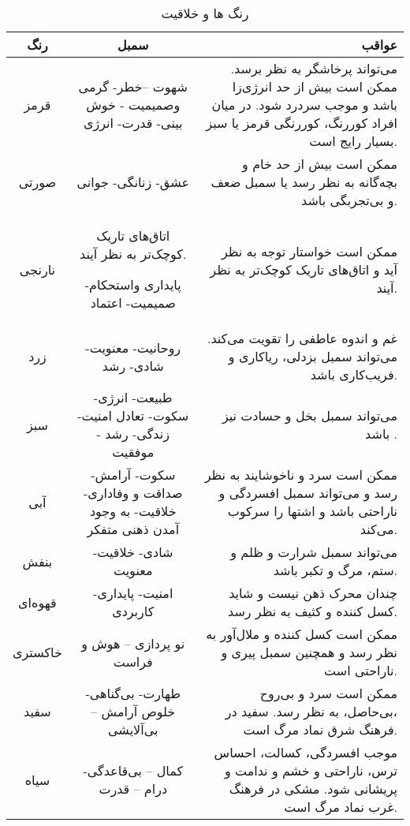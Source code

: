 \documentclass[12pt]{report}
\begin{document}
\begin{table}
\begin{center}
	\fontsize{10}{11}\selectfont
	\begin{tabulary}{1.0\textwidth}{CCR}
\hline
 رنگ & سمبل & عواقب \\ 
\hline 
\hline 
 قرمز & شهوت –خطر- گرمی وصمیمیت - خوش بینی- قدرت- انرژی & می‌تواند پرخاشگر به نظر برسد. ممکن است بیش از حد انرژی‌زا باشد و موجب سردرد شود. 
در میان افراد کوررنگ، کوررنگی قرمز یا سبز بسیار رایج است. \\ 
\hline
 صورتی & عشق- زنانگی- جوانی & ممکن است بیش از حد خام و بچه‌گانه به نظر رسد یا سمبل ضعف و بی‌تجربگی باشد. \\ 
\hline
 نارنجی & اتاق‌های تاریک کوچک‌تر به نظر آیند.

پایداری واستحکام- صمیمیت- اعتماد & ممکن است خواستار توجه به نظر آید و اتاق‌های تاریک کوچک‌تر به نظر آیند. \\ 
\hline
 زرد & روحانیت- معنویت- شادی- رشد & غم و اندوه عاطفی را تقویت می‌کند. می‌تواند سمبل بزدلی، ریاکاری و فریب‌کاری باشد. \\ 
\hline
 سبز & 	
طبیعت- انرژی- سکوت- تعادل امنیت- زندگی- رشد - موفقیت & می‌تواند سمبل بخل و حسادت نیز باشد . \\ 
\hline
 آبی & سکوت- آرامش- صداقت و وفاداری- خلاقیت- به وجود آمدن ذهنی متفکر & ممکن است سرد و ناخوشایند به نظر رسد و می‌تواند سمبل افسردگی و ناراحتی باشد و اشتها را سرکوب می‌کند. \\ 
\hline
 بنفش & شادی- خلاقیت- معنویت & می‌تواند سمبل شرارت و ظلم و ستم، مرگ و تکبر باشد. \\ 
\hline
 قهوه‌ای & امنیت- پایداری- کاربردی & چندان محرک ذهن نیست و شاید کسل کننده و کثیف به نظر رسد. \\ 
\hline
 خاکستری & نو پردازی – هوش و فراست & ممکن است کسل کننده و ملال‌آور به نظر رسد و همچنین سمبل پیری و ناراحتی است. \\ 
\hline
 سفید & طهارت- بی‌گناهی- خلوص آرامش – بی‌آلایشی & ممکن است سرد و بی‌روح ،بی‌حاصل، به نظر رسد. سفید در فرهنگ شرق نماد مرگ است. \\ 
\hline
 سیاه & کمال – بی‌قاعدگی- درام – قدرت & موجب افسردگی، کسالت، احساس ترس، ناراحتی و خشم و ندامت و پریشانی شود. مشکی در فرهنگ غرب نماد مرگ است. \\ 
\hline 
\hline 

\end{tabulary} 
\end{center}
\caption{ رنگ ها و خلاقیت}
\label{table:colors}
\end{table}
\end{document}
